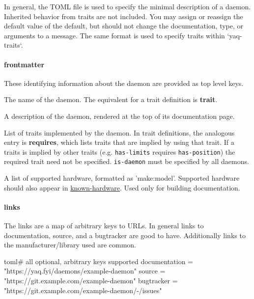 In general, the TOML file is used to specify the minimal description of
a daemon. Inherited behavior from traits are not included. You may
assign or reassign the default value of the default, but should not
change the documentation, type, or arguments to a message. The same
format is used to specify traits within `yaq-traits`.

\hypertarget{frontmatter}{%
\paragraph{frontmatter}\label{frontmatter}}

These identifying information about the daemon are provided as top level
keys.

\begin{description}
\tightlist
\item[\textbf{protocol} (string)]
The name of the daemon. The equivalent for a trait definition is
\textbf{trait}.
\item[\textbf{doc} (string)]
A description of the daemon, rendered at the top of its documentation
page.
\item[\textbf{traits} (\{'items': 'string', 'type': 'array'\})]
List of traits implemented by the daemon. In trait definitions, the
analogous entry is \textbf{requires}, which lists traits that are
implied by using that trait. If a traits is implied by other traits
(e.g. \texttt{has-limits} requires \texttt{has-position}) the required
trait need not be specified. \texttt{is-daemon} must be specified by all
daemons.
\item[\textbf{hardware} (\{'items': 'string', 'type': 'array'\})]
A list of supported hardware, formatted as 'make:model'. Supported
hardware should also appear in
\href{https://github.com/yaq-project/yaq-fyi/blob/main/known-hardware.toml}{known-hardware}.
Used only for building documentation.
\end{description}

\hypertarget{links}{%
\paragraph{links}\label{links}}

The links are a map of arbitrary keys to URLs. In general links to
documentation, source, and a bugtracker are good to have. Additionally
links to the manufacturer/library used are common.

\begin{codefragment}{toml}\noop
[links]  # all optional, arbitrary keys supported
documentation = "https://yaq.fyi/daemons/example-daemon"
source = "https://git.example.com/example-daemon"
bugtracker = "https://git.example.com/example-daemon/-/issues"
\end{codefragment}

